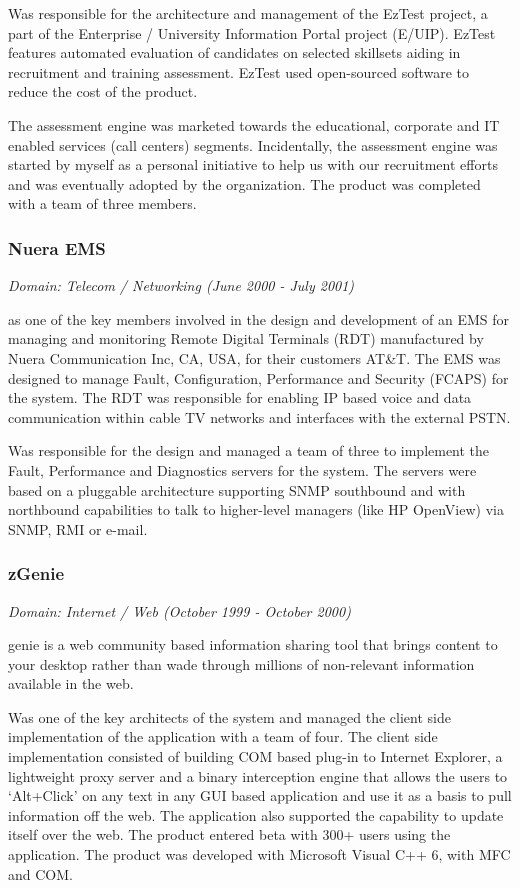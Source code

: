 \documentclass[a4paper,12pt]{article}
\newcommand\cvprojectentry[5]{
  \subsubsection*{#1}
  
  \vspace{-7pt}
  
  \it{Domain: #2}\normalfont{} \quad (#3 - #4)
  
}
\begin{document}
Was responsible for the architecture and management of the EzTest
project, a part of the Enterprise / University Information Portal
project (E/UIP). EzTest features automated evaluation of candidates on
selected skillsets aiding in recruitment and training
assessment. EzTest used open-sourced software to reduce the cost of
the product.
 
The assessment engine was marketed towards the educational, corporate
and IT enabled services (call centers) segments. Incidentally, the
assessment engine was started by myself as a personal initiative to
help us with our recruitment efforts and was eventually adopted by the
organization. The product was completed with a team of three members.
 
\cvprojectentry{Nuera EMS}{Telecom / Networking}{June 2000}{July 2001}

Was one of the key members involved in the design and development of
an EMS for managing and monitoring Remote Digital Terminals (RDT)
manufactured by Nuera Communication Inc, CA, USA, for their customers
AT\&T. The EMS was designed to manage Fault, Configuration, Performance
and Security (FCAPS) for the system. The RDT was responsible for
enabling IP based voice and data communication within cable TV
networks and interfaces with the external PSTN.
 
Was responsible for the design and managed a team of three to
implement the Fault, Performance and Diagnostics servers for the
system. The servers were based on a pluggable architecture supporting
SNMP southbound and with northbound capabilities to talk to
higher-level managers (like HP OpenView) via SNMP, RMI or e-mail.
 
\cvprojectentry{zGenie}{Internet / Web}{October 1999}{October 2000}

Zgenie is a web community based information sharing tool that brings
content to your desktop rather than wade through millions of
non-relevant information available in the web.
 
Was one of the key architects of the system and managed the client
side implementation of the application with a team of four. The client
side implementation consisted of building COM based plug-in to
Internet Explorer, a lightweight proxy server and a binary
interception engine that allows the users to `Alt+Click' on any text
in any GUI based application and use it as a basis to pull information
off the web. The application also supported the capability to update
itself over the web. The product entered beta with 300+ users using
the application. The product was developed with Microsoft Visual C++
6, with MFC and COM.
 
\end{document}
